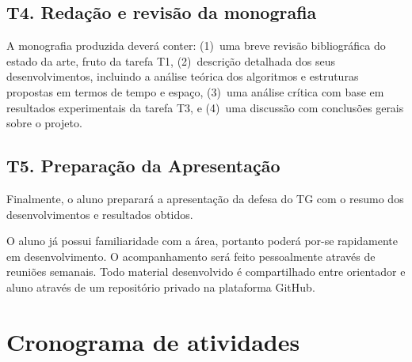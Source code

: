 \documentclass[12pt, a4paper, oneside]{article}
\begin{document}
\subsection*{T4. Redação e revisão da monografia}

A monografia produzida deverá conter:
(1)~uma breve revisão bibliográfica do estado da arte, fruto da tarefa T1, (2)~descrição detalhada dos seus desenvolvimentos, incluindo a análise teórica dos algoritmos e estruturas propostas em termos de tempo e espaço, (3)~uma análise crítica com base em resultados experimentais da tarefa T3, e (4)~uma discussão com conclusões gerais sobre o projeto.


\subsection*{T5. Preparação da Apresentação}

Finalmente, o aluno preparará a apresentação da defesa do TG com o resumo dos desenvolvimentos e resultados obtidos.

\medskip

O aluno já possui familiaridade com a área, portanto poderá por-se rapidamente em desenvolvimento. O acompanhamento será feito pessoalmente através de reuniões semanais. Todo material desenvolvido é compartilhado entre orientador e aluno através de um repositório privado na plataforma GitHub. 


\section*{Cronograma de atividades}
\end{document}
